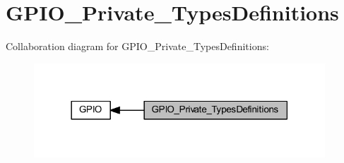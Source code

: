 \hypertarget{group___g_p_i_o___private___types_definitions}{}\section{G\+P\+I\+O\+\_\+\+Private\+\_\+\+Types\+Definitions}
\label{group___g_p_i_o___private___types_definitions}
Collaboration diagram for G\+P\+I\+O\+\_\+\+Private\+\_\+\+Types\+Definitions\+:
\nopagebreak
\begin{figure}[H]
\begin{center}
\leavevmode
\includegraphics[width=309pt]{group___g_p_i_o___private___types_definitions}
\end{center}
\end{figure}
